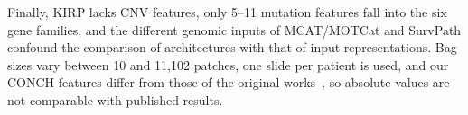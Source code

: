 \documentclass[10pt,twocolumn,letterpaper]{article}
\begin{document}
Finally, KIRP lacks CNV features, only 5--11 mutation features fall into the six gene families, and the different genomic inputs of MCAT/MOTCat and SurvPath confound the comparison of architectures with that of input representations. Bag sizes vary between 10 and 11,102 patches, one slide per patient is used, and our CONCH features differ from those of the original works~\cite{chen2021mcat,xu2023motcat,jaume2024survpath}, so absolute values are not comparable with published results.


{
    \small
    
    
}
\end{document}
